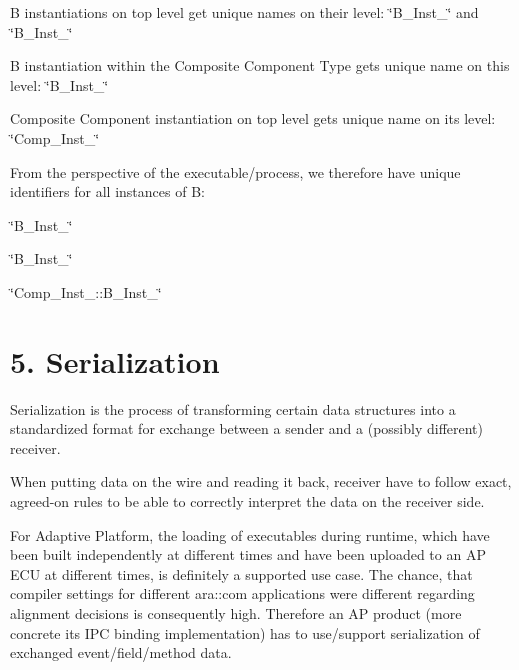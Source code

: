 \begin{DoxyItemize}
\begin{DoxyItemize}
\item B instantiations on top level get unique names on their level\+: \char`\"{}\+B\+\_\+\+Inst\+\_\char`\"{} and \char`\"{}\+B\+\_\+\+Inst\+\_\char`\"{}
\item B instantiation within the Composite Component Type gets unique name on this level\+: \char`\"{}\+B\+\_\+\+Inst\+\_\char`\"{}
\item Composite Component instantiation on top level gets unique name on its level\+: \char`\"{}\+Comp\+\_\+\+Inst\+\_\char`\"{}
\item From the perspective of the executable/process, we therefore have unique identifiers for all instances of B\+:
\begin{DoxyItemize}
\item \char`\"{}\+B\+\_\+\+Inst\+\_\char`\"{}
\item \char`\"{}\+B\+\_\+\+Inst\+\_\char`\"{}
\item \char`\"{}\+Comp\+\_\+\+Inst\+\_\+::\+B\+\_\+\+Inst\+\_\char`\"{}
\end{DoxyItemize}
\end{DoxyItemize}
\end{DoxyItemize}

\section*{5. Serialization}


\begin{DoxyItemize}
\item Serialization is the process of transforming certain data structures into a standardized format for exchange between a sender and a (possibly different) receiver.
\item When putting data on the wire and reading it back, receiver have to follow exact, agreed-\/on rules to be able to correctly interpret the data on the receiver side.
\item For Adaptive Platform, the loading of executables during runtime, which have been built independently at different times and have been uploaded to an AP E\+CU at different times, is definitely a supported use case. The chance, that compiler settings for different ara\+::com applications were different regarding alignment decisions is consequently high. Therefore an AP product (more concrete its I\+PC binding implementation) has to use/support serialization of exchanged event/field/method data.
\end{DoxyItemize}

